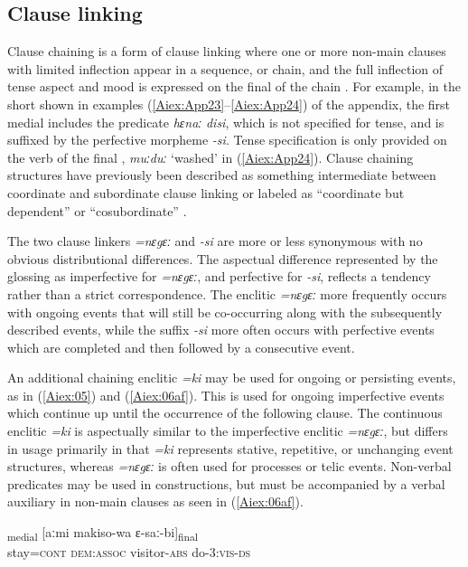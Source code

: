 \documentclass[output=paper]{LSP/langsci}
\begin{document}
\subsection{Clause linking} 
\label{Ailinking}
Clause chaining is a form of clause linking where one or more non-main clauses with limited
inflection appear in a sequence, or chain, and the full inflection of tense aspect and mood is expressed
on the final  of the chain \citep[][374--376]{longacre07}. For example, in the short  shown
in examples (\ref{Aiex:App23}--\ref{Aiex:App24}) of the appendix, the first medial  includes the predicate \textit{hɛnaː} \textit{disi}, which is not specified for
tense, and is suffixed by the perfective  morpheme \textit{-si}. Tense specification is only provided on the verb of the final , \textit{muːduː} `washed' in (\ref{Aiex:App24}). Clause chaining structures have previously been described as something intermediate
between coordinate and subordinate clause linking or labeled as ``coordinate but dependent''
\citep{haiman83}  or ``cosubordinate'' \citep{valin84}.

The two clause linkers \textit{=nɛgɛː} and \textit{-si} are more or less synonymous with no obvious
distributional differences. The aspectual difference represented by the glossing as imperfective for
\textit{=nɛgɛː}, and perfective for \textit{-si}, reflects a tendency rather than a strict correspondence. The enclitic \textit{=nɛgɛː}
more frequently occurs with ongoing events that will still be co-occurring along with the subsequently
described events, while the suffix \textit{-si} more often occurs with perfective events which are completed and
then followed by a consecutive event. 

An additional chaining enclitic \textit{=ki} may be used for ongoing or persisting events, as in (\ref{Aiex:05}) and (\ref{Aiex:06af}). This is used for ongoing imperfective events which continue up until the occurrence of the
following clause. The continuous enclitic \textit{=ki} is aspectually similar to the imperfective enclitic \textit{=nɛgɛː}, but differs in usage
primarily in that \textit{=ki} represents stative, repetitive, or unchanging event structures, whereas \textit{=nɛgɛː} is
often used for processes or telic events. Non-verbal predicates may be used in 
constructions, but must be accompanied by a verbal auxiliary in non-main clauses as seen in (\ref{Aiex:06af}).


\begin{exe}
\ex \label{Aiex:05}
\gll [sɛnɛ=\textbf{ki}]\textsubscript{medial} [aːmi makiso-wa ɛ-saː-bi]\textsubscript{final}\\
stay=\textsc{cont} \textsc{dem}:\textsc{assoc} visitor-\textsc{abs}	do-\textsc{3}:\textsc{vis}-\textsc{ds}\\
\glt {}\\
\end{exe}
\end{document}
